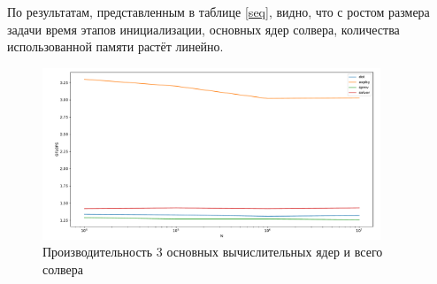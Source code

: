 		По результатам, представленным в таблице \ref{seq}, видно, что с ростом размера задачи время этапов инициализации, основных ядер солвера, количества использованной памяти растёт линейно.
        \begin{figure}[H]
            \centering
            \includegraphics[width=0.9\textwidth]{./images/seq_perf}
            \caption{Производительность 3 основных вычислительных ядер и всего солвера}
        \end{figure}
